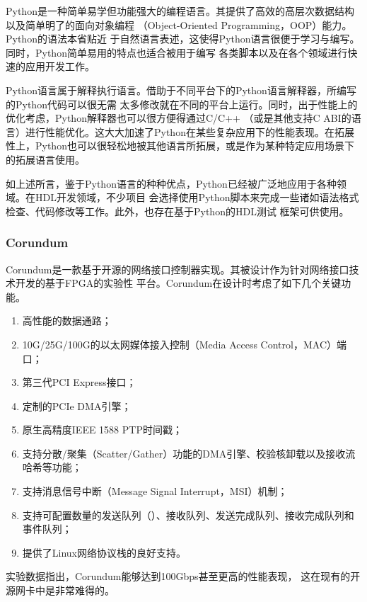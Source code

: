 Python是一种简单易学但功能强大的编程语言。其提供了高效的高层次数据结构以及简单明了的面向对象编程
（Object-Oriented Programming，OOP）能力\cite{python_tutorial}。Python的语法本省贴近
于自然语言表述，这使得Python语言很便于学习与编写。同时，Python简单易用的特点也适合被用于编写
各类脚本以及在各个领域进行快速的应用开发工作。

Python语言属于解释执行语言。借助于不同平台下的Python语言解释器，所编写的Python代码可以很无需
太多修改就在不同的平台上运行。同时，出于性能上的优化考虑，Python解释器也可以很方便得通过C/C++
（或是其他支持C ABI的语言）进行性能优化。这大大加速了Python在某些复杂应用下的性能表现。在拓展
性上，Python也可以很轻松地被其他语言所拓展，或是作为某种特定应用场景下的拓展语言使用\cite{binkert2011gem5}。

如上述所言，鉴于Python语言的种种优点，Python已经被广泛地应用于各种领域。在HDL开发领域，不少项目
会选择使用Python脚本来完成一些诸如语法格式检查、代码修改等工作。此外，也存在基于Python的HDL测试
框架可供使用\cite{cocotb_doc}。

\subsubsection{Corundum}
\label{section:principle_corundum}

Corundum是一款基于开源的网络接口控制器实现。其被设计作为针对网络接口技术开发的基于FPGA的实验性
平台。Corundum在设计时考虑了如下几个关键功能\cite{forencich2020corundum}。

\begin{enumerate}
  \item 高性能的数据通路；
  \item 10G/25G/100G的以太网媒体接入控制（Media Access Control，MAC）端口；
  \item 第三代PCI Express接口；
  \item 定制的PCIe DMA引擎；
  \item 原生高精度IEEE 1588 PTP时间戳；
  \item 支持分散/聚集（Scatter/Gather）功能的DMA引擎、校验核卸载以及接收流哈希等功能；
  \item 支持消息信号中断（Message Signal Interrupt，MSI）机制；
  \item 支持可配置数量的发送队列（）、接收队列、发送完成队列、接收完成队列和事件队列；
  \item 提供了Linux网络协议栈的良好支持。
\end{enumerate}

实验数据指出，Corundum能够达到100Gbps甚至更高的性能表现\cite{forencich2020corundum}，
这在现有的开源网卡中是非常难得的。

